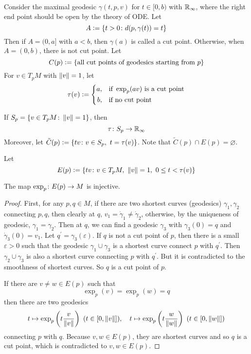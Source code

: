 Consider the maximal geodesic $\gamma(t,p,v)$ for $t \in [0,b)$ with $\mathbb{R}_\infty$, where the right end point should be open by the theory of ODE. Let
\begin{equation*}
	A \vcentcolon= \left\{t > 0 \colon d(p,\gamma(t)) = t\right\}
\end{equation*}
Then if $A = (0,a]$ with $a < b$, then $\gamma(a)$ is called a cut point. Otherwise, when $A = (0,b)$, there is not cut point. Let
\begin{equation*}
	C(p) \vcentcolon= \left\{\text{all cut points of geodesics starting from }p\right\}
\end{equation*}
For $v \in T_pM$ with $\left\lVert v\right\lVert = 1$, let
\begin{equation*}
	\tau(v) \vcentcolon= \left\{
		\begin{aligned}
			a,&\quad\text{if }\exp_p(av)\text{ is a cut point}\\
			b,&\quad\text{if no cut point}
		\end{aligned}
	\right.
\end{equation*}
\begin{rmk}
	If $S_p = \left\{v\in T_pM \colon \left\lVert v\right\lVert = 1\right\}$, then
	\begin{equation*}
		\tau \colon S_p \rightarrow \mathbb{R}_\infty
	\end{equation*}
	Moreover, let $\tilde{C}(p) \vcentcolon= \left\{tv \colon v \in S_p,~t = \tau(v)\right\}$. Note that $\tilde{C}(p) \cap E(p) = \varnothing$.
\end{rmk}
Let
\begin{equation*}
	E(p) \vcentcolon= \left\{tv \colon v \in T_pM,~\left\lVert v\right\lVert = 1,~0 \leq t < \tau(v)\right\}
\end{equation*}
\begin{prop}\label{prop:}
	The map $\exp_p\colon E(p) \rightarrow M$ is injective.
\end{prop}
\begin{proof}
	First, for any $p,q \in M$, if there are two shortest curves (geodesics) $\gamma_1,\gamma_2$ connecting $p,q$, then clearly at $q$, $v_1=\dot{\gamma}_1 \neq \dot{\gamma}_2$, otherwise, by the uniqueness of geodesic, $\gamma_1 = \gamma_2$. Then at $q$, we can find a geodesic $\gamma_3$ with $\gamma_3(0)= q$ and $\dot{\gamma}_3(0) = v_1$. Let $q^\prime = \gamma_3(\varepsilon)$. If $q$ is not a cut point of $p$, then there is a small $\varepsilon > 0$ such that the geodesic $\gamma_1 \cup \gamma_3$ is a shortest curve connect $p$ with $q^\prime$. Then $\gamma_2 \cup \gamma_3$ is also a shortest curve connecting $p$ with $q^\prime$. But it is contradicted to the smoothness of shortest curves. So $q$ is a cut point of $p$.

	\noindent If there are $v \neq w \in E(p)$ such that
	\begin{equation*}
		\exp_p(v) = \exp_p(w) = q
	\end{equation*}
	then there are two geodesics
	\begin{equation*}
		t\mapsto \exp_p\left(t\frac{v}{\left\lVert v\right\lVert}\right)~(t \in [0,\left\lVert v\right\lVert]),\quad t\mapsto \exp_p\left(t\frac{w}{\left\lVert w\right\lVert}\right) ~(t \in [0,\left\lVert w\right\lVert])
	\end{equation*}
	connecting $p$ with $q$. Because $v,w \in E(p)$, they are shortest curves and so $q$ is a cut point, which is contradicted to $v,w \in E(p)$.
\end{proof}

